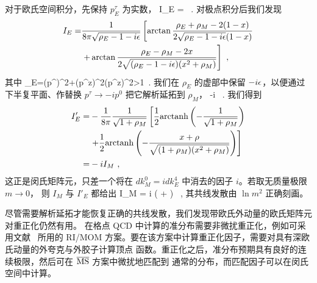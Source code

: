 对于欧氏空间积分，先保持 $p^\tau_E$ 为实数，
\beq \label{eq:eloop}
I_E =   \ .
\eeq
对极点积分后我们发现
\begin{align}	\label{eq: ie}
I_E =& {1\over 8\pi\sqrt{\rho_E-1-i\epsilon}} \left[\arctan{\rho_E+\rho_M-2(1-x)\over2 \sqrt{\rho_E-1-i\epsilon}(1-x)} \right.\nonumber\\
&\left.+ \arctan {\rho_E-\rho_M-2x\over2 \sqrt{(\rho_E-1-i\epsilon)(x^2+\rho_M)}}\right] \ ,
\end{align}
其中
\beq \label{eq: rho}
\rho_E={(p^\tau)^2+(p^z)^2\over (p^z)^2}>1\ .
\eeq
我们在 $\rho_E$ 的虚部中保留 $-i\epsilon$，以便通过下半复平面、作替换 $p^\tau \rightarrow -ip^0$
把它解析延拓到 $\rho_M$，
\beq \label{eq: cont}
 \to -i \ .
\eeq
我们得到
\begin{align} \label{eq: iecont}
I'_E =&-{1\over8\pi}{1\over \sqrt{1+\rho_M}} \left[ {1\over2}\text{arctanh}\left(- {1\over\sqrt{1+\rho_M}}\right)\right.\nonumber\\
&\left. + {1\over2}\text{arctanh}\left(-{x+\rho\over\sqrt{(1+\rho_M)(x^2+\rho_M)}}\right)\right]\nonumber\\
=& -i I_M \ ,
\end{align}
这正是闵氏矩阵元，只差一个将在 $dk^0_M=idk^4_E$ 中消去的因子 $i$。若取无质量极限 $m\to0$，
则 $I_M$ 与 $I'_E$ 都给出
\beq \label{eq: oslimit}
I_M = {i\pi} \left( +  \right) \ ,
\eeq
其共线发散由 $\ln m^2$ 正确刻画。

尽管需要解析延拓才能恢复正确的共线发散，我们发现带欧氏外动量的欧氏矩阵元对重正化仍然有用。
在格点 QCD 中计算的准分布需要非微扰重正化，例如可采用文献~\cite{Alexandrou:2017huk,Chen:2017mzz,Stewart:2017tvs}
所用的 RI/MOM 方案。要在该方案中计算重正化因子，需要对具有深欧氏动量的外夸克与外胶子计算顶点
函数。重正化之后，准分布预期具有良好的连续极限，然后可在 $\overline{\rm MS}$ 方案中微扰地匹配到
通常的分布，而匹配因子可以在闵氏空间中计算。

